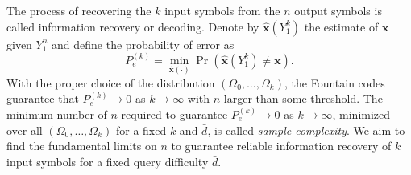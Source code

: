 \documentclass[11pt,onecolumn]{IEEEtran}
\newcommand{\beq}{\begin{equation}}
\newcommand{\eeq}{\end{equation}}
\newcommand{\bx}{\mathbf{x}}
\newcommand{\bard}{\bar{d}}
\begin{document}
The process of recovering the $k$ input symbols from the $n$ output symbols is called information recovery or decoding. 
Denote by $\hat{\mathbf{x}}(Y_1^k)$ the estimate of $\bx$ given $Y_1^n$ and define the probability of error as 
\beq\label{eqn:err_prob}
P_e^{(k)}=\min_{\hat{\bx}(\cdot)}\Pr(\hat{\bx}(Y_1^k)\neq \bx).
\eeq
With the proper choice of the distribution  $(\Omega_0,\dots, \Omega_k)$, the Fountain codes guarantee that $P_e^{(k)}\to 0$ as $k\to\infty$ with $n$ larger than some threshold.
The minimum number of $n$ required to guarantee $P_e^{(k)}\to 0$ as $k\to\infty$, minimized over all $(\Omega_0,\dots, \Omega_k)$ for a fixed $k$ and $\bard$, is called \emph{sample complexity}.
We aim to find the fundamental limits on $n$ to guarantee reliable information recovery of $k$ input symbols for a fixed query difficulty $\bar{d}$. %
\end{document}
